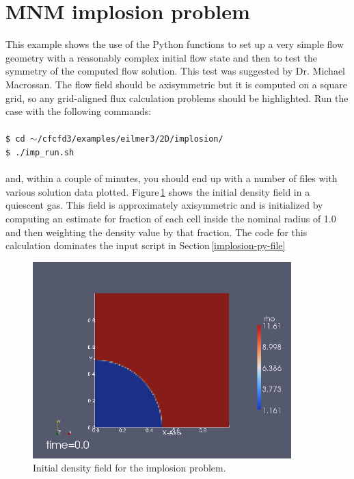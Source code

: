 
\section{MNM implosion problem}
\label{mnm-implosion-sec}
%
This example shows the use of the Python functions to set up
a very simple flow geometry with a reasonably complex initial flow state 
and then to test the symmetry of the computed flow solution.
This test was suggested by Dr. Michael Macrossan.
The flow field should be axisymmetric but it is computed on a square grid,
so any grid-aligned flux calculation problems should be highlighted.
Run the case with the following commands:\\
%
\topbar\\
\texttt{\$ cd $\sim$/cfcfd3/examples/eilmer3/2D/implosion/}\\
\texttt{\$ ./imp\_run.sh}\\
\bottombar\\
%
and, within a couple of minutes, you should end up with a number of files
with various solution data plotted.
Figure\,\ref{implosion-initial-density-fig} shows the initial density field
in a quiescent gas.
This field is approximately axisymmetric and is initialized by computing an estimate
for fraction of each cell inside the nominal radius of 1.0 and then weighting the
density value by that fraction.
The code for this calculation dominates the input script in Section\,\ref{implosion-py-file}

\begin{figure}[htbp]
\begin{center}
\includegraphics[width=10cm]{../2D/implosion/density-t0000.png}
\end{center}
\caption{Initial density field for the implosion problem.}
\label{implosion-initial-density-fig}
\end{figure}


